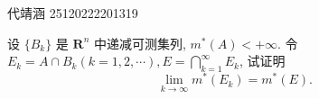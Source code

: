 \documentclass[../main.tex]{subfiles}
\begin{document}
\ifSubfilesClassLoaded{

    
    \setcounter{chapter}{1}
    \setcounter{section}{2}
}{}

\chapter{  }
\section{}
代靖涵 25120222201319

\begin{exercise}{}{}
设 $\{B_k\}$ 是 $\mathbf{R}^n$ 中递减可测集列, $m^*(A) < +\infty$. 令 $E_k = A \cap B_k (k=1,2,\cdots), E = \bigcap_{k=1}^{\infty} E_k$, 试证明
\[ \lim_{k \to \infty} m^*(E_k) = m^*(E). \]
\end{exercise}
\end{document}
